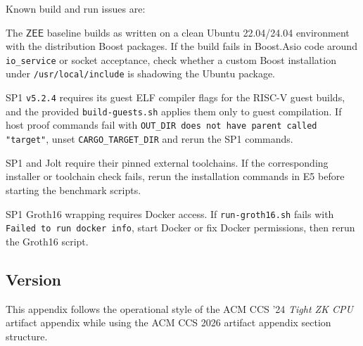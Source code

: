 \documentclass[nonacm,sigconf]{acmart}
\newcommand{\zee}[0]{\ensuremath{\mathsf{ZEE}}\xspace}
\begin{document}
Known build and run issues are:
\begin{compactitem}
\item The \zee baseline builds as written on a clean Ubuntu
22.04/24.04 environment with the distribution Boost packages. If the
build fails in Boost.Asio code around \texttt{io\_service} or socket
acceptance, check whether a custom Boost installation under
\texttt{/usr/local/include} is shadowing the Ubuntu package.
\item SP1 \texttt{v5.2.4} requires its guest ELF compiler flags for
the RISC-V guest builds, and the provided \texttt{build-guests.sh}
applies them only to guest compilation. If host proof commands fail
with \texttt{OUT\_DIR does not have parent called "target"}, unset
\texttt{CARGO\_TARGET\_DIR} and rerun the SP1 commands.
\item SP1 and Jolt require their pinned external toolchains. If the
corresponding installer or toolchain check fails, rerun the installation
commands in E5 before starting the benchmark scripts.
\item SP1 Groth16 wrapping requires Docker access. If
\texttt{run-groth16.sh} fails with \texttt{Failed to run docker info},
start Docker or fix Docker permissions, then rerun the Groth16 script.
\end{compactitem}

\subsection{Version}

This appendix follows the operational style of the ACM CCS '24
\textit{Tight ZK CPU} artifact appendix while using the ACM CCS 2026
artifact appendix section structure.
\end{document}
